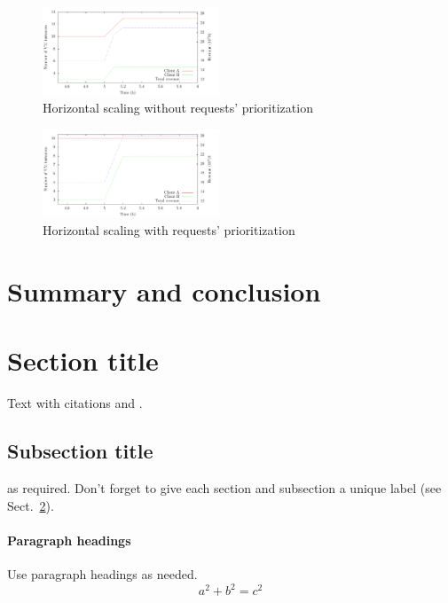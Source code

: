 \documentclass[twocolumn]{svjour3}          %
\begin{document}
\begin{figure}
  \includegraphics[width=0.47\textwidth]{figures/request-priority-revenue-1}
\caption{Horizontal scaling without  requests' prioritization}
\label{fig:hor-scaling-no-prioritization}       %
\end{figure}

\begin{figure}
  \includegraphics[width=0.47\textwidth]{figures/request-priority-revenue-2}
\caption{Horizontal scaling with requests' prioritization}
\label{fig:hor-scaling-with-prioritization}       %
\end{figure}


\section{Summary and conclusion}

\section{Section title}
\label{sec:1}
Text with citations \cite{RefB} and \cite{RefJ}.
\subsection{Subsection title}
\label{sec:2}
as required. Don't forget to give each section
and subsection a unique label (see Sect.~\ref{sec:1}).
\paragraph{Paragraph headings} Use paragraph headings as needed.
\begin{equation}
a^2+b^2=c^2
\end{equation}
\end{document}
